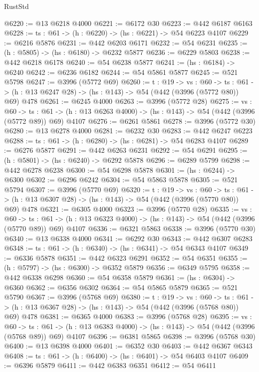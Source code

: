 \begin{lexlean}{RustStd}
\begin{coremodule}
@6220 := @13 @6218 @4000
@6221 := @6172 @30
@6223 := @442 @6187 @6163
@6228 := {ts : @61} -> (h : @6220) -> (hs : @6221) -> @54 @6223 @4107
@6229 := @6216 @5876
@6231 := @442 @6203 @6171
@6232 := @54 @6231
@6235 := (h : @5805) -> (hs : @6180) -> @6232 @5877
@6236 := @6229 @5803
@6238 := @442 @6218 @6178
@6240 := @54 @6238 @5877
@6241 := (hs : @6184) -> @6240
@6242 := @6236 @6182
@6244 := @54 @5861 @5877
@6245 := @521 @5798
@6247 := @3996 (@5772 @69)
@6260 := {t : @19} ->
  {vs : @60} ->
  {ts : @61} -> (h : @13 @6247 @28) -> (hs : @143) -> @54 (@442 (@3996 (@5772 @80)) @69) @478
@6261 := @6245 @4000
@6263 := @3996 (@5772 @28)
@6275 := {vs : @60} ->
  {ts : @61} -> (h : @13 @6263 @4000) -> (hs : @143) -> @54 (@442 (@3996 (@5772 @89)) @69) @4107
@6276 := @6261 @5861
@6278 := @3996 (@5772 @30)
@6280 := @13 @6278 @4000
@6281 := @6232 @30
@6283 := @442 @6247 @6223
@6288 := {ts : @61} -> (h : @6280) -> (hs : @6281) -> @54 @6283 @4107
@6289 := @6276 @5877
@6291 := @442 @6263 @6231
@6292 := @54 @6291
@6295 := (h : @5801) -> (hs : @6240) -> @6292 @5878
@6296 := @6289 @5799
@6298 := @442 @6278 @6238
@6300 := @54 @6298 @5878
@6301 := (hs : @6244) -> @6300
@6302 := @6296 @6242
@6304 := @54 @5863 @5878
@6305 := @521 @5794
@6307 := @3996 (@5770 @69)
@6320 := {t : @19} ->
  {vs : @60} ->
  {ts : @61} -> (h : @13 @6307 @28) -> (hs : @143) -> @54 (@442 (@3996 (@5770 @80)) @69) @478
@6321 := @6305 @4000
@6323 := @3996 (@5770 @28)
@6335 := {vs : @60} ->
  {ts : @61} -> (h : @13 @6323 @4000) -> (hs : @143) -> @54 (@442 (@3996 (@5770 @89)) @69) @4107
@6336 := @6321 @5863
@6338 := @3996 (@5770 @30)
@6340 := @13 @6338 @4000
@6341 := @6292 @30
@6343 := @442 @6307 @6283
@6348 := {ts : @61} -> (h : @6340) -> (hs : @6341) -> @54 @6343 @4107
@6349 := @6336 @5878
@6351 := @442 @6323 @6291
@6352 := @54 @6351
@6355 := (h : @5797) -> (hs : @6300) -> @6352 @5879
@6356 := @6349 @5795
@6358 := @442 @6338 @6298
@6360 := @54 @6358 @5879
@6361 := (hs : @6304) -> @6360
@6362 := @6356 @6302
@6364 := @54 @5865 @5879
@6365 := @521 @5790
@6367 := @3996 (@5768 @69)
@6380 := {t : @19} ->
  {vs : @60} ->
  {ts : @61} -> (h : @13 @6367 @28) -> (hs : @143) -> @54 (@442 (@3996 (@5768 @80)) @69) @478
@6381 := @6365 @4000
@6383 := @3996 (@5768 @28)
@6395 := {vs : @60} ->
  {ts : @61} -> (h : @13 @6383 @4000) -> (hs : @143) -> @54 (@442 (@3996 (@5768 @89)) @69) @4107
@6396 := @6381 @5865
@6398 := @3996 (@5768 @30)
@6400 := @13 @6398 @4000
@6401 := @6352 @30
@6403 := @442 @6367 @6343
@6408 := {ts : @61} -> (h : @6400) -> (hs : @6401) -> @54 @6403 @4107
@6409 := @6396 @5879
@6411 := @442 @6383 @6351
@6412 := @54 @6411

\end{coremodule}
\end{lexlean}
